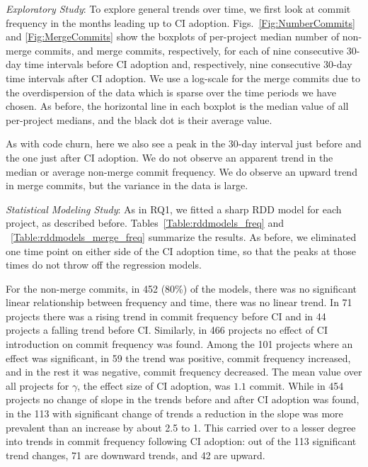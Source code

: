 \smallskip\noindent \emph{Exploratory Study}: 
To explore general trends over time, we first look at commit frequency in 
the months leading up to CI adoption.
Figs.~\ref{Fig:NumberCommits} and \ref{Fig:MergeCommits} show the boxplots of per-project median 
number of non-merge commits, and merge commits, respectively, for each of nine consecutive 30-day time intervals 
before CI adoption and, respectively, nine consecutive 30-day time intervals 
after CI adoption.
We use a log-scale for the merge commits due to the overdispersion of the data which is sparse over the time periods we have chosen.
As before, the horizontal line in each boxplot is the median value of all 
per-project medians, and the black dot is their average value.

As with code churn, here we also see a peak in the 30-day 
interval just before and the one just after CI adoption.
We do not observe an apparent trend in the 
median or average non-merge commit frequency.
We do observe an upward trend in merge commits, but the variance in the data is large.

\smallskip\noindent \emph{Statistical Modeling Study}: 
As in RQ1, we fitted a sharp RDD model for each project, as described before.
Tables~\ref{Table:rddmodels_freq} and ~\ref{Table:rddmodels_merge_freq} summarize the results.
As before, we eliminated one time point on either side of the CI adoption 
time, so that the peaks at those times  do not throw off the regression models.


For the non-merge commits, in 452 (80\%) of the models, there was no significant linear relationship 
between  frequency and time, \ie there was no linear trend.
In 71 projects there was a rising trend in commit frequency before CI 
and in 44 projects a falling trend before CI.
Similarly, in 466 projects no effect of CI introduction on commit frequency 
was found. 
Among the 101 projects where an effect was significant, in 59 the trend 
was positive, \ie commit frequency increased, and in the rest it was 
negative, \ie commit frequency decreased.
The mean value over all projects for $\gamma$, the effect size of CI 
adoption, was $1.1$ commit.
While in 454 projects no change of slope in the trends before and after CI 
adoption was found, in the 113 with significant change of trends a reduction 
in the slope was more prevalent than an increase by about 2.5 to 1.
This carried over to a lesser degree into trends in commit frequency 
following CI adoption: out of the 113 significant trend changes, 71 are 
downward trends, and 42 are upward.

